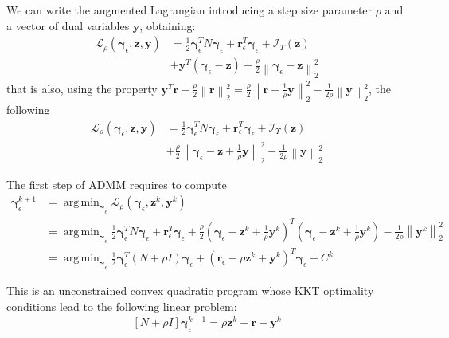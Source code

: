 \documentclass[final,3p]{elsarticle}
\newcommand{\vect}[1]{\bm{#1}}
\newcommand{\norm}[1]{\left\lVert#1\right\rVert}
\DeclareMathOperator*{\argmin}{arg\,min} %
\begin{document}
We can write the augmented Lagrangian introducing a step size parameter $\rho$ and a vector of dual variables $\vect{y}$, obtaining:
\begin{align}
\mathcal{L}_{\rho} \left(\vect{\gamma}_\epsilon,\vect{z},\vect{y} \right) &= 
\frac{1}{2} \vect{\gamma}_\epsilon^T N \vect{\gamma}_\epsilon + \vect{r}^T_\epsilon \vect{\gamma}_\epsilon  
+  \mathcal{I}_\Upsilon(\vect{z}) \nonumber \\
&+ \vect{y}^T (\vect{\gamma}_\epsilon - \vect{z}) 
+ \frac{\rho}{2} \norm{\vect{\gamma}_\epsilon - \vect{z}}_2^2
\end{align}
that is also, using the property $\vect{y}^T\vect{r} + \frac{\rho}{2}\norm{\vect{r}}_2^2 = \frac{\rho}{2}\norm{\vect{r}+\frac{1}{\rho} \vect{y}}_2^2 - \frac{1}{2\rho} \norm{\vect{y}}_2^2$, the following
\begin{align}
\mathcal{L}_{\rho} \left(\vect{\gamma}_\epsilon,\vect{z},\vect{y} \right) &= 
\frac{1}{2} \vect{\gamma}_\epsilon^T N \vect{\gamma}_\epsilon + \vect{r}^T_\epsilon \vect{\gamma}_\epsilon  
+  \mathcal{I}_\Upsilon(\vect{z}) \nonumber \\
&+ \frac{\rho}{2} \norm{\vect{\gamma}_\epsilon - \vect{z} + \frac{1}{\rho} \vect{y}}_2^2
- \frac{1}{2\rho} \norm{\vect{y}}_2^2
\label{eq:augmentedlagrangian}
\end{align}

The first step of ADMM requires to compute 
\begin{align}
\vect{\gamma}_\epsilon^{k+1} &= \argmin_{\vect{\gamma}_\epsilon} \mathcal{L}_{\rho} \left( \vect{\gamma}_\epsilon,\vect{z}^k,\vect{y}^k \right) \\
 &= \argmin_{\vect{\gamma}_\epsilon} \frac{1}{2} \vect{\gamma}_\epsilon^T N \vect{\gamma}_\epsilon + \vect{r}^T_\epsilon \vect{\gamma}_\epsilon  
+ \frac{\rho}{2} (\vect{\gamma}_\epsilon - \vect{z}^k + \frac{1}{\rho} \vect{y}^k)^T(\vect{\gamma}_\epsilon - \vect{z}^k + \frac{1}{\rho} \vect{y}^k)
- \frac{1}{2\rho} \norm{\vect{y}^k}_2^2 \\
 &= \argmin_{\vect{\gamma}_\epsilon} \frac{1}{2} \vect{\gamma}_\epsilon^T (N+ \rho I) \vect{\gamma}_\epsilon 
   + (\vect{r}_\epsilon - \rho \vect{z}^k + \vect{y}^k)^T \vect{\gamma}_\epsilon + C^k 
\end{align}

This is an unconstrained convex quadratic program whose KKT optimality conditions lead to the following linear problem:
\begin{align}
    \left[ N + \rho I \right] \vect{\gamma}_\epsilon^{k+1} =  \rho \vect{z}^k - \vect{r} - \vect{y}^k
		\label{eq:admm_1b}
\end{align}
\end{document}
